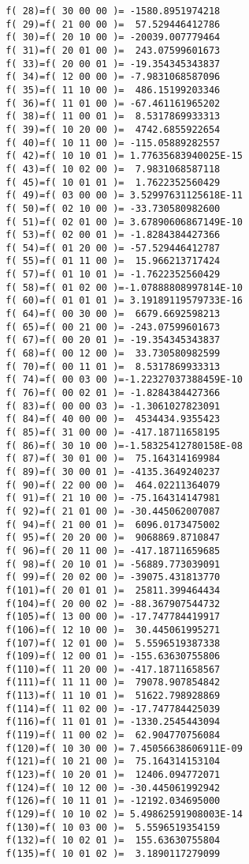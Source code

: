 \begin{footnotesize}
\begin{verbatim}
 f( 28)=f( 30 00 00 )= -1580.8951974218
 f( 29)=f( 21 00 00 )=  57.529446412786
 f( 30)=f( 20 10 00 )= -20039.007779464
 f( 31)=f( 20 01 00 )=  243.07599601673
 f( 33)=f( 20 00 01 )= -19.354345343837
 f( 34)=f( 12 00 00 )= -7.9831068587096
 f( 35)=f( 11 10 00 )=  486.15199203346
 f( 36)=f( 11 01 00 )= -67.461161965202
 f( 38)=f( 11 00 01 )=  8.5317869933313
 f( 39)=f( 10 20 00 )=  4742.6855922654
 f( 40)=f( 10 11 00 )= -115.05889282557
 f( 42)=f( 10 10 01 )= 1.77635683940025E-15
 f( 43)=f( 10 02 00 )=  7.9831068587118
 f( 45)=f( 10 01 01 )=  1.7622352560429
 f( 49)=f( 03 00 00 )= 3.52997631125618E-11
 f( 50)=f( 02 10 00 )= -33.730580982600
 f( 51)=f( 02 01 00 )= 3.67890606867149E-10
 f( 53)=f( 02 00 01 )= -1.8284384427366
 f( 54)=f( 01 20 00 )= -57.529446412787
 f( 55)=f( 01 11 00 )=  15.966213717424
 f( 57)=f( 01 10 01 )= -1.7622352560429
 f( 58)=f( 01 02 00 )=-1.07888808997814E-10
 f( 60)=f( 01 01 01 )= 3.19189119579733E-16
 f( 64)=f( 00 30 00 )=  6679.6692598213
 f( 65)=f( 00 21 00 )= -243.07599601673
 f( 67)=f( 00 20 01 )= -19.354345343837
 f( 68)=f( 00 12 00 )=  33.730580982599
 f( 70)=f( 00 11 01 )=  8.5317869933313
 f( 74)=f( 00 03 00 )=-1.22327037388459E-10
 f( 76)=f( 00 02 01 )= -1.8284384427366
 f( 83)=f( 00 00 03 )= -1.3061027823091
 f( 84)=f( 40 00 00 )=  4534434.9355423
 f( 85)=f( 31 00 00 )= -417.18711658195
 f( 86)=f( 30 10 00 )=-1.58325412780158E-08
 f( 87)=f( 30 01 00 )=  75.164314169984
 f( 89)=f( 30 00 01 )= -4135.3649240237
 f( 90)=f( 22 00 00 )=  464.02211364079
 f( 91)=f( 21 10 00 )= -75.164314147981
 f( 92)=f( 21 01 00 )= -30.445062007087
 f( 94)=f( 21 00 01 )=  6096.0173475002
 f( 95)=f( 20 20 00 )=  9068869.8710847
 f( 96)=f( 20 11 00 )= -417.18711659685
 f( 98)=f( 20 10 01 )= -56889.773039091
 f( 99)=f( 20 02 00 )= -39075.431813770
 f(101)=f( 20 01 01 )=  25811.399464434
 f(104)=f( 20 00 02 )= -88.367907544732
 f(105)=f( 13 00 00 )= -17.747784419917
 f(106)=f( 12 10 00 )=  30.445061995271
 f(107)=f( 12 01 00 )=  5.5596519387338
 f(109)=f( 12 00 01 )= -155.63630755806
 f(110)=f( 11 20 00 )= -417.18711658567
 f(111)=f( 11 11 00 )=  79078.907854842
 f(113)=f( 11 10 01 )=  51622.798928869
 f(114)=f( 11 02 00 )= -17.747784425039
 f(116)=f( 11 01 01 )= -1330.2545443094
 f(119)=f( 11 00 02 )=  62.904770756084
 f(120)=f( 10 30 00 )= 7.45056638606911E-09
 f(121)=f( 10 21 00 )=  75.164314153104
 f(123)=f( 10 20 01 )=  12406.094772071
 f(124)=f( 10 12 00 )= -30.445061992942
 f(126)=f( 10 11 01 )= -12192.034695000
 f(129)=f( 10 10 02 )= 5.49862591908003E-14
 f(130)=f( 10 03 00 )=  5.5596519354159
 f(132)=f( 10 02 01 )=  155.63630755804
 f(135)=f( 10 01 02 )=  3.1890117279099

\end{verbatim}
\end{footnotesize}
